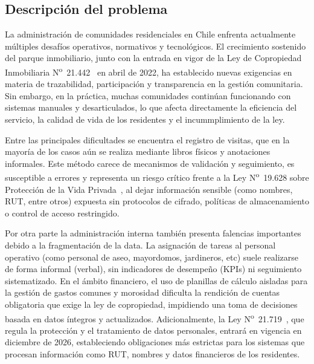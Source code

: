 \subsection{Descripción del problema}
La administración de comunidades residenciales en Chile enfrenta actualmente múltiples desafíos operativos, normativos y tecnológicos. El crecimiento sostenido del parque inmobiliario, junto con la entrada en vigor de la Ley de Copropiedad Inmobiliaria N\textsuperscript{o}~21.442~\cite{ley21442} en abril de 2022, ha establecido nuevas exigencias en materia de trazabilidad, participación y transparencia en la gestión comunitaria. Sin embargo, en la práctica, muchas comunidades continúan funcionando con sistemas manuales y desarticulados, lo que afecta directamente la eficiencia del servicio, la calidad de vida de los residentes y el incummplimiento de la ley.

Entre las principales dificultades se encuentra el registro de visitas, que en la mayoría de los casos aún se realiza mediante libros físicos y anotaciones informales. Este método carece de mecanismos de validación y seguimiento, es susceptible a errores y representa un riesgo crítico frente a la Ley N\textsuperscript{o}~19.628 sobre Protección de la Vida Privada~\cite{ley19628}, al dejar información sensible (como nombres, RUT, entre otros) expuesta sin protocolos de cifrado, políticas de almacenamiento o control de acceso restringido.

Por otra parte la administración interna también presenta falencias importantes debido a la fragmentación de la data. La asignación de tareas al personal operativo (como personal de aseo, mayordomos, jardineros, etc) suele realizarse de forma informal (verbal), sin indicadores de desempeño (KPIs) ni seguimiento sistematizado. En el ámbito financiero, el uso de planillas de cálculo aisladas para la gestión de gastos comunes y morosidad dificulta la rendición de cuentas obligatoria que exige la ley de copropiedad, impidiendo una toma de decisiones basada en datos íntegros y actualizados. Adicionalmente, la Ley N\textsuperscript{o}~21.719~\cite{ley21719}, que regula la protección y el tratamiento de datos personales, entrará en vigencia en diciembre de 2026, estableciendo obligaciones más estrictas para los sistemas que procesan información como RUT, nombres y datos financieros de los residentes.

